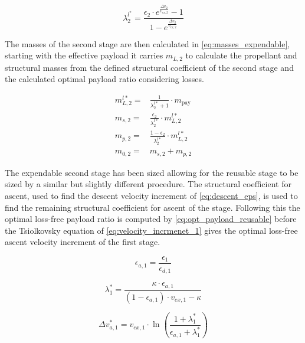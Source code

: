 \begin{equation}
    \lambda_2^{l^*} = \frac{\epsilon_2 \cdot e^{\frac{\Delta v_2}{v_{ex,2}}}-1}{1 - e^{\frac{\Delta v_2}{v_{ex,2}}}}
\label{eq:payload_opt_losses}
\end{equation}

The masses of the second stage are then calculated in \autoref{eq:masses_expendable}, starting with the effective payload it carries $m_{L,2}$ to calculate the propellant and structural masses from the defined structural coefficient of the second stage and the calculated optimal payload ratio considering losses.

\begin{equation}
\begin{aligned}
    m_{L,2}^{l*} =& \frac{1}{\lambda_{2}^{l*} + 1} \cdot m_{\text{pay}} \\
    m_{s,2} =& \frac{\epsilon_2}{\lambda_{2}^{l*}} \cdot m_{L,2}^{l*} \\
    m_{p,2} =& \frac{1 - \epsilon_2}{\lambda_2^{l*}} \cdot m_{L,2}^{l*} \\
    m_{0,2} =& m_{s,2} + m_{p,2}
\end{aligned}
\label{eq:masses_expendable}
\end{equation}

The expendable second stage has been sized allowing for the reusable stage to be sized by a similar but slightly different procedure. The structural coefficient for ascent, used to find the descent velocity increment of \autoref{eq:descent_eps}, is used to find the remaining structural coefficient for ascent of the stage. Following this the optimal loss-free payload ratio is computed by \autoref{eq:opt_payload_reusable} before the Tsiolkovsky equation of \autoref{eq:velocity_incrmenet_1} gives the optimal loss-free ascent velocity increment of the first stage. 

\begin{equation}
    \epsilon_{a,1} = \frac{\epsilon_1}{\epsilon_{d,1}}
\label{eq:resuable_strc_a}
\end{equation}

\begin{equation}
    \lambda_1^* = \frac{\kappa \cdot \epsilon_{a,1}}{(1 - \epsilon_{a,1}) \cdot v_{ex,1} - \kappa}
\label{eq:opt_payload_reusable}
\end{equation}

\begin{equation}
    \Delta v_{a,1}^* = v_{ex,1} \cdot \ln(\frac{1 + \lambda_1^*}{\epsilon_{a,1} + \lambda_1^*})
\label{eq:velocity_incrmenet_1}
\end{equation}


